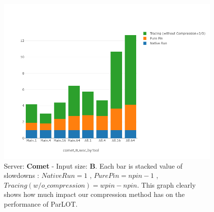 \begin{figure}[!t]
\centering
\includegraphics[width=5in]{figs.comet/comet_chartDet_B_woc_byTool_p3_5.png}
\caption{ Server: \textbf{Comet} - Input size: \textbf{B}. Each bar is stacked value of slowdowns : $Native Run = 1$ , $Pure Pin = npin - 1$ , $Tracing (w/o \_compression) = wpin - npin$.
This graph clearly shows how much impact our compression method has on the performance of ParLOT.
}
\label{comet_chartDet_B_woc_byTool_p3_5}
\end{figure}